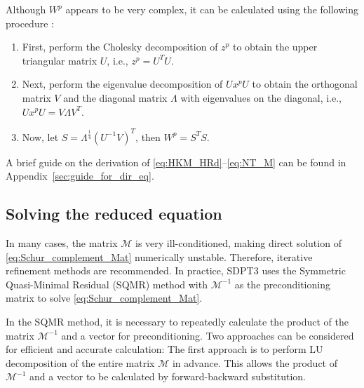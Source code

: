 Although $W^p$ appears to be very complex, it can be calculated using the following procedure \cite{todd1998}:
\begin{enumerate}
    \item First, perform the Cholesky decomposition of $z^p$ to obtain the upper triangular matrix $U$, i.e., $z^p=U^TU$.
    \item Next, perform the eigenvalue decomposition of $U x^p U$ to obtain the orthogonal matrix $V$ and the diagonal matrix $\Lambda$ with eigenvalues on the diagonal, i.e., $U x^p U = V \Lambda V^T$.
    \item Now, let $S=\Lambda^\frac{1}{4}(U^{-1}V)^T$, then $W^p=S^T S$.
\end{enumerate}

A brief guide on the derivation of \eqref{eq:HKM_HRd}--\eqref{eq:NT_M} can be found in Appendix~\ref{sec:guide_for_dir_eq}.

\subsection{Solving the reduced equation}
In many cases, the matrix $\mathcal{M}$ is very ill-conditioned, making direct solution of \eqref{eq:Schur_complement_Mat} numerically unstable. Therefore, iterative refinement methods are recommended. In practice, SDPT3 \cite{toh1999} uses the Symmetric Quasi-Minimal Residual (SQMR) method \cite{Freund1994} with $\mathcal{M}^{-1}$ as the preconditioning matrix to solve \eqref{eq:Schur_complement_Mat}.

In the SQMR method, it is necessary to repeatedly calculate the product of the matrix $\mathcal{M}^{-1}$ and a vector for preconditioning. Two approaches can be considered for efficient and accurate calculation:
The first approach is to perform LU decomposition of the entire matrix $\mathcal{M}$ in advance. This allows the product of $\mathcal{M}^{-1}$ and a vector to be calculated by forward-backward substitution.

